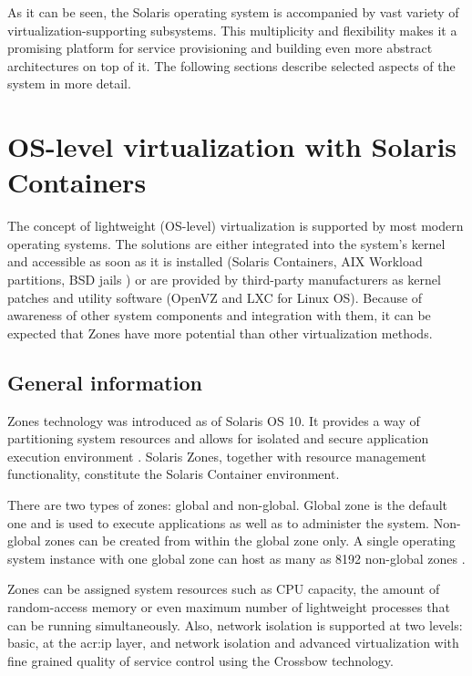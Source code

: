 \documentclass[11pt]{book}
\begin{document}
      As it can be seen, the Solaris operating system is accompanied by vast variety of virtualization-supporting
      subsystems. This multiplicity and flexibility makes it a promising platform for service provisioning and building
      even more abstract architectures on top of it. The following sections describe selected aspects of the system in
      more detail.


    \section{OS-level virtualization with Solaris Containers}
    \label{sec:sol:containers}


      The concept of lightweight (OS-level) virtualization is supported by most modern operating systems. The solutions
      are either integrated into the system's kernel and accessible as soon as it is installed (Solaris Containers, AIX
      Workload partitions, BSD jails \cite{kamp}) or are provided by third-party manufacturers as kernel patches and
      utility software (OpenVZ and LXC for Linux OS). Because of awareness of other system components and integration 
      with them, it can be expected that Zones have more potential than other virtualization methods.


      \subsection{General information}
      \label{sub:}

        Zones technology was introduced as of Solaris OS 10. It provides a way of partitioning system resources and
        allows for isolated and secure application execution environment \cite{sag}. Solaris Zones, together with
        resource management functionality, constitute the Solaris Container environment.

        There are two types of zones: global and non-global. Global zone is the default one and is used to execute
        applications as well as to administer the system. Non-global zones can be created from within the global zone
        only. A single operating system instance with one global zone can host as many as 8192 non-global zones
        \cite{sag}.

        Zones can be assigned system resources such as CPU capacity, the amount of random-access memory or even maximum
        number of lightweight processes that can be running simultaneously. Also, network isolation is supported at two
        levels: basic, at the \gls{acr:ip} layer, and network isolation and advanced virtualization with fine grained quality of
        service control using the Crossbow technology.
\end{document}
